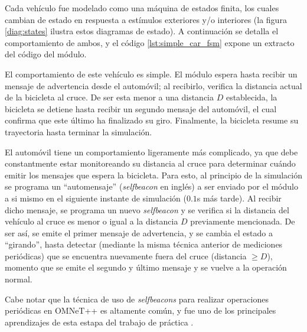 \documentclass[11pt,letterpaper]{article}
\begin{document}
Cada vehículo fue modelado como una máquina de estados finita, los cuales cambian de estado en respuesta a estímulos exteriores y/o interiores (la figura \ref{diag:states} ilustra estos diagramas de estado). A continuación se detalla el comportamiento de ambos, y el código \ref{lst:simple_car_fsm} expone un extracto del código del módulo.

\begin{description}[leftmargin=!,labelwidth=\widthof{\bfseries Automóvil}]
    \item [Bicicleta]  El comportamiento de este vehículo es simple. El módulo espera hasta recibir un mensaje de advertencia desde el automóvil; al recibirlo, verifica la distancia actual de la bicicleta al cruce. De ser esta menor a una distancia $D$ establecida, la bicicleta se detiene hasta recibir un segundo mensaje del automóvil, el cual confirma que este último ha finalizado su giro. Finalmente, la bicicleta resume su trayectoria hasta terminar la simulación.
    \item [Automóvil]  El automóvil tiene un comportamiento ligeramente más complicado, ya que debe constantmente estar monitoreando su distancia al cruce para determinar cuándo emitir los mensajes que espera la bicicleta. Para esto, al principio de la simulación se programa un ``automensaje'' (\emph{selfbeacon} en inglés) a ser enviado por el módulo a si mismo en el siguiente instante de simulación ($0.1$s más tarde). Al recibir dicho mensaje, se programa un nuevo \emph{selfbeacon} y se verifica si la distancia del vehículo al cruce es menor o igual a la distancia $D$ previamente mencionada. De ser así, se emite el primer mensaje de advertencia, y se cambia el estado a ``girando'', hasta detectar (mediante la misma técnica anterior de mediciones periódicas) que se encuentra nuevamente fuera del cruce (distancia $\geq D$), momento que se emite el segundo y último mensaje y se vuelve a la operación normal.
\end{description}

Cabe notar que la técnica de uso de \emph{selfbeacons} para realizar operaciones periódicas en OMNeT++ es altamente común, y fue uno de los principales aprendizajes de esta estapa del trabajo de práctica \cite{selfmessage}.
\end{document}
